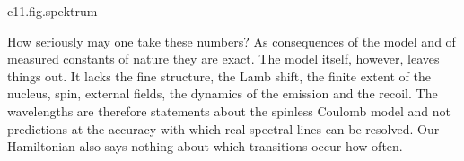 \begin{tpcfigure}{c11.fig.spektrum}
  \caption{The same transitions as wavelengths according to \eqref{c11.eq.linie}, on a
    logarithmic axis. Each stroke is a line; solid the Lyman series
    ($\nqn = 2, \ldots, 12$), dashed the Balmer series ($\nqn = 3, \ldots, 12$). Just as
    the levels accumulate at $E = 0$, the lines of each series crowd at their series
    limit, the wavelength for $\nqn \to \infty$. Between the two series lies no line of
    either.}
\end{tpcfigure}

How seriously may one take these numbers? As consequences of the model and of measured
constants of nature they are exact. The model itself, however, leaves
things out. It lacks the fine structure, the Lamb shift, the finite extent of the
nucleus, spin, external fields, the dynamics of the emission and the recoil. The wavelengths are therefore statements
about the spinless Coulomb model and not predictions at the accuracy with which real
spectral lines can be resolved. Our Hamiltonian also says nothing about which
transitions occur how often.

